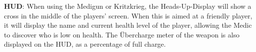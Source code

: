 {\bf HUD}: When using the Medigun or Kritzkrieg, the Heads-Up-Display will show a cross in the middle of the players' screen. When this is aimed at a friendly player, it will display the name and current health level of the player, allowing the Medic to discover who is low on health. The Übercharge meter of the weapon is also displayed on the HUD, as a percentage of full charge.
